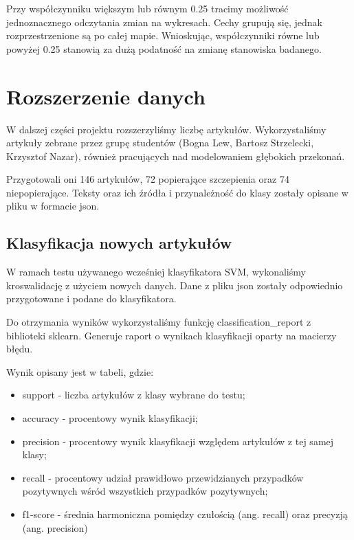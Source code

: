 \documentclass[11pt]{article}
\begin{document}
Przy współczynniku większym lub równym 0.25 tracimy możliwość jednoznacznego odczytania zmian na wykresach. Cechy grupują się, jednak rozprzestrzenione są po całej mapie. Wnioskując, współczynniki równe lub powyżej 0.25 stanowią za dużą podatność na zmianę stanowiska badanego.

    \section*{Rozszerzenie danych}

    W dalszej części projektu rozszerzyliśmy liczbę artykułów.
    Wykorzystaliśmy artykuły zebrane przez grupę studentów 
    (Bogna Lew, Bartosz Strzelecki, Krzysztof Nazar), również pracujących nad 
    modelowaniem głębokich przekonań.

    Przygotowali oni 146 artykułów, 72 popierające szczepienia oraz 74 niepopierające.
    Teksty oraz ich źródła i przynależność do klasy zostały opisane w pliku w formacie json.


    \subsection*{Klasyfikacja nowych artykułów}

    W ramach testu używanego wcześniej klasyfikatora SVM, 
    wykonaliśmy kroswalidację z użyciem nowych danych.
    Dane z pliku json zostały odpowiednio przygotowane i podane do klasyfikatora.

    Do otrzymania wyników wykorzystaliśmy funkcję classification\_report
    z biblioteki sklearn. Generuje raport o wynikach klasyfikacji oparty na 
    macierzy błędu.

    Wynik opisany jest w tabeli, gdzie:
    \begin{itemize}
        \item support - liczba artykułów z klasy wybrane do testu;
        \item accuracy - procentowy wynik klasyfikacji;
        \item precision - procentowy wynik klasyfikacji względem 
        artykułów z tej samej klasy;
        \item recall - procentowy udział prawidłowo przewidzianych przypadków
        pozytywnych wśród wszystkich przypadków pozytywnych;
        \item f1-score - średnia harmoniczna pomiędzy czułością 
        (ang. recall) oraz precyzją (ang. precision)
    \end{itemize}
\end{document}
